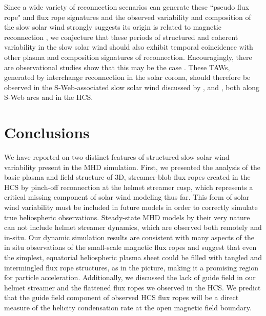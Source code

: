 \documentclass[preprint]{aastex62}
\begin{document}
Since a wide variety of reconnection scenarios can generate 
these ``pseudo flux rope" and flux rope signatures and the observed variability and composition 
of the slow solar wind strongly suggests its origin is related to 
magnetic reconnection \citep{Zurbuchen2007,ZhaoL2017}, we conjecture that these periods of structured and 
coherent variability in the slow solar wind should also exhibit 
temporal coincidence with other plasma and composition 
signatures of reconnection. Encouragingly, there are observational 
studies show that this may be the case \citep{Feng2015a,Feng2015b,Yu2016,Kepko2016, WangYM2018}. These TAWs, generated by interchange reconnection in the solar corona, should therefore be observed in the S-Web-associated slow solar wind discussed by \citet{Antiochos2011}, \citet{Higginson2017a} and , both along S-Web arcs and in the HCS.

\section{Conclusions}
\label{sxn_conc}

We have reported on two distinct features of structured slow 
solar wind variability present in the  
MHD simulation. 
%
First, we presented the analysis of the basic plasma and field 
structure of 3D, streamer-blob flux ropes created in the HCS by pinch-off 
reconnection at the helmet streamer cusp, which  
represents a critical missing component of solar wind modeling thus far. This form of solar wind variability must be included in 
future models in order to correctly simulate true heliospheric observations. Steady-state MHD 
models by their very nature can not include helmet streamer dynamics, which are observed both 
remotely and in-situ. Our dynamic simulation results are consistent with many aspects of the in situ 
observations of the small-scale magnetic flux ropes {and} suggest 
that even the simplest, equatorial heliospheric plasma sheet 
could be filled with tangled and intermingled flux rope structures, 
as in the \citet{Crooker1996hps} picture, making it a promising region 
for particle acceleration. Additionally, we {discussed} the lack of guide field in our helmet streamer and the flattened flux ropes we observed in the HCS. We predict that the guide field component of observed HCS flux ropes will be a direct measure of the helicity condensation rate at the open magnetic field boundary. 
\end{document}

